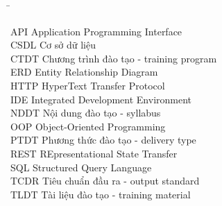 \documentclass[12pt]{report}
\begin{document}
\begin{tabbing}
\hspace{8cm} \= \hspace{10cm} \kill

API \> Application Programming Interface \\
CSDL \> Cơ sở dữ liệu \\
CTDT \> Chương trình đào tạo - training program \\
ERD \> Entity Relationship Diagram \\
HTTP \> HyperText Transfer Protocol \\
IDE \> Integrated Development Environment \\
NDDT \> Nội dung đào tạo - syllabus \\
OOP \> Object-Oriented Programming \\
PTDT \> Phương thức đào tạo - delivery type \\
REST \> REpresentational State Transfer \\
SQL \> Structured Query Language \\
TCDR \> Tiêu chuẩn đầu ra - output standard \\
TLDT \> Tài liệu đào tạo - training material \\
\end{tabbing}

\pagebreak


\thispagestyle{fancy}








\pagebreak

\nocite{*}

\printbibliography[heading=bibintoc,type=online,title={DANH MỤC TÀI LIỆU THAM KHẢO}]
\end{document}
